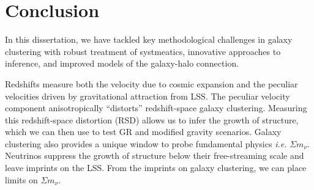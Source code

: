 \newcommand{\mneut}{$\Sigma m_\nu$}

\chapter*{Conclusion}

In this dissertation, we have tackled key methodological challenges 
in galaxy clustering with robust treatment of systmeatics, innovative
approaches to inference, and improved models of the galaxy-halo 
connection. 







Redshifts measure both the velocity due to cosmic expansion and the peculiar velocities driven by gravitational attraction from LSS. 
The peculiar velocity component anisotropically ``distorts'' redshift-space galaxy clustering. 
Measuring this redshift-space distortion (RSD) allows us to infer the growth of structure, which we can then use to test GR and modified gravity scenarios. 
Galaxy clustering also provides a unique window to probe fundamental physics {\em i.e.} \mneut. 
Neutrinos suppress the growth of structure below their free-streaming scale and leave imprints on the LSS. 
From the imprints on galaxy clustering, we can place limits on \mneut. 

